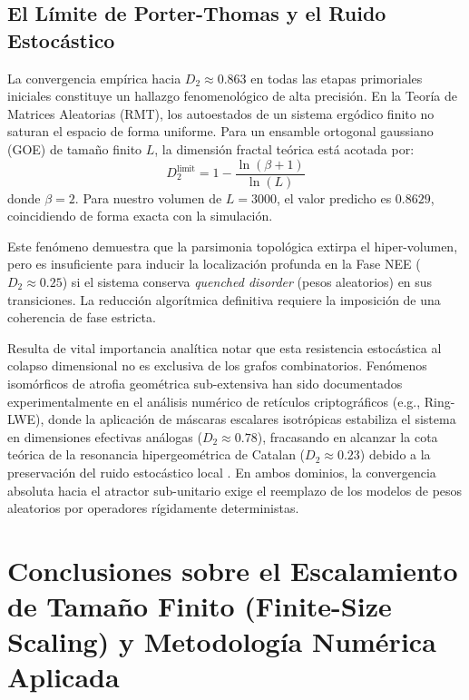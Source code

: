 \documentclass[sn-mathphys]{sn-jnl}
\begin{document}
\subsection{El Límite de Porter-Thomas y el Ruido Estocástico}
La convergencia empírica hacia $D_2 \approx 0.863$ en todas las etapas primoriales iniciales constituye un hallazgo fenomenológico de alta precisión. En la Teoría de Matrices Aleatorias (RMT), los autoestados de un sistema ergódico finito no saturan el espacio de forma uniforme. Para un ensamble ortogonal gaussiano (GOE) de tamaño finito $L$, la dimensión fractal teórica está acotada por:
\begin{equation}
D_2^{\text{limit}} = 1 - \frac{\ln(\beta + 1)}{\ln(L)}
\end{equation}
donde $\beta=2$. Para nuestro volumen de $L=3000$, el valor predicho es $0.8629$, coincidiendo de forma exacta con la simulación. 

Este fenómeno demuestra que la parsimonia topológica extirpa el hiper-volumen, pero es insuficiente para inducir la localización profunda en la Fase NEE ($D_2 \approx 0.25$) si el sistema conserva \textit{quenched disorder} (pesos aleatorios) en sus transiciones. La reducción algorítmica definitiva requiere la imposición de una coherencia de fase estricta. 

Resulta de vital importancia analítica notar que esta resistencia estocástica al colapso dimensional no es exclusiva de los grafos combinatorios. Fenómenos isomórficos de atrofia geométrica sub-extensiva han sido documentados experimentalmente en el análisis numérico de retículos criptográficos (e.g., Ring-LWE), donde la aplicación de máscaras escalares isotrópicas estabiliza el sistema en dimensiones efectivas análogas ($D_2 \approx 0.78$), fracasando en alcanzar la cota teórica de la resonancia hipergeométrica de Catalan ($D_2 \approx 0.23$) debido a la preservación del ruido estocástico local \cite{PeinadorLWE2026}. En ambos dominios, la convergencia absoluta hacia el atractor sub-unitario exige el reemplazo de los modelos de pesos aleatorios por operadores rígidamente deterministas.

\section{Conclusiones sobre el Escalamiento de Tamaño Finito (Finite-Size Scaling) y Metodología Numérica Aplicada}
\end{document}
